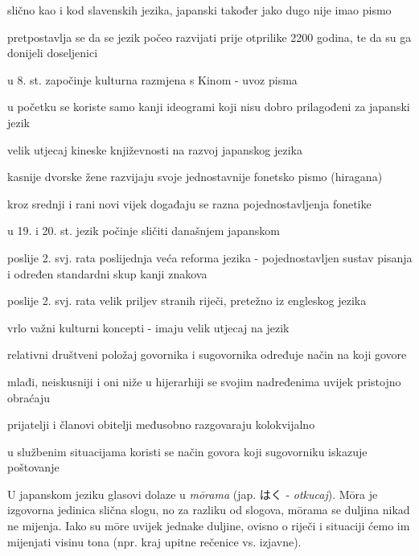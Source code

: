 	\begin{hyou}
		\item slično kao i kod slavenskih jezika, japanski također jako dugo nije imao pismo
		\item pretpostavlja se da se jezik počeo razvijati prije otprilike 2200 godina, te da su ga donijeli doseljenici
		\item u 8. st. započinje kulturna razmjena s Kinom - uvoz pisma
		\item u početku se koriste samo kanji ideogrami koji nisu dobro prilagođeni za japanski jezik
		\item velik utjecaj kineske književnosti na razvoj japanskog jezika
		\item kasnije dvorske žene razvijaju svoje jednostavnije fonetsko pismo (hiragana)
		\item kroz srednji i rani novi vijek događaju se razna pojednostavljenja fonetike
		\item u 19. i 20. st. jezik počinje sličiti današnjem japanskom
		\item poslije 2. svj. rata poslijednja veća reforma jezika - pojednostavljen sustav pisanja i određen standardni skup kanji znakova
		\item poslije 2. svj. rata velik priljev stranih riječi, pretežno iz engleskog jezika
	\end{hyou}

	\begin{hyou}
		\item vrlo važni kulturni koncepti - imaju velik utjecaj na jezik
		\item relativni društveni položaj govornika i sugovornika određuje način na koji govore
		\item mlađi, neiskusniji i oni niže u hijerarhiji se svojim nadređenima uvijek pristojno obraćaju
		\item prijatelji i članovi obitelji međusobno razgovaraju kolokvijalno
		\item u službenim situacijama koristi se način govora koji sugovorniku iskazuje poštovanje
	\end{hyou}
\newpage
{}

	
	
	U japanskom jeziku glasovi dolaze u \textit{m\={o}rama} (jap. はく - \textit{otkucaj}). M\={o}ra je izgovorna jedinica slična slogu, no za razliku od slogova, m\={o}rama se duljina nikad ne mijenja. Iako su m\={o}re uvijek jednake duljine, ovisno o riječi i situaciji ćemo im mijenjati visinu tona (npr. kraj upitne rečenice vs. izjavne).
	
